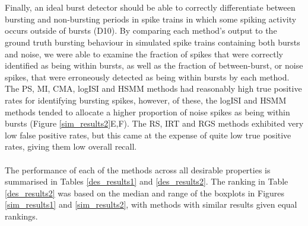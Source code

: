 \documentclass[12pt, titlepage]{article}
\begin{document}
	\\ \\ Finally, an ideal burst detector should be able to correctly differentiate between bursting and non-bursting periods in spike trains in which some spiking activity occurs outside of bursts (D10). By comparing each method's output to the ground truth bursting behaviour in simulated spike trains containing both bursts and noise, we were able to examine the fraction of spikes that were correctly identified as being within bursts, as well as the fraction of between-burst, or noise spikes, that were erroneously detected as being within bursts by each method.
	The PS, MI, CMA, logISI and HSMM methods had reasonably high true positive rates for identifying bursting spikes, however, of these, the logISI and HSMM methods tended to allocate a higher proportion of noise spikes as being within bursts (Figure \ref{sim_results2}E,F). The RS, IRT and RGS methods exhibited very low false positive rates, but this came at the expense of quite low true positive rates, giving them low overall recall.
	\\ \\ The performance of each of the methods across all desirable properties is summarised in Tables \ref{des_results1} and \ref{des_results2}. The ranking in Table \ref{des_results2} was based on the median and range of the boxplots in Figures \ref{sim_results1} and \ref{sim_results2}, with methods with similar results given equal rankings.
\end{document}
